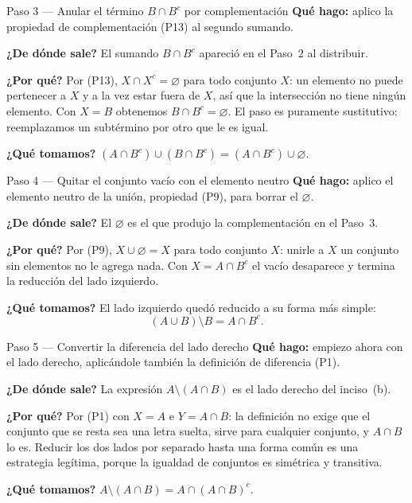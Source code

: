 \documentclass[11pt]{article}
\begin{document}
\begin{paso}{Paso 3 --- Anular el término $B\cap B^{c}$ por complementación}
\textbf{Qué hago:} aplico la propiedad de complementación (P13) al segundo sumando.

\textbf{¿De dónde sale?} El sumando $B\cap B^{c}$ apareció en el Paso~2 al distribuir.

\textbf{¿Por qué?} Por (P13), $X\cap X^{c}=\varnothing$ para todo conjunto $X$: un elemento no
puede pertenecer a $X$ y a la vez estar fuera de $X$, así que la intersección no tiene ningún
elemento. Con $X=B$ obtenemos $B\cap B^{c}=\varnothing$. El paso es puramente sustitutivo:
reemplazamos un subtérmino por otro que le es igual.

\textbf{¿Qué tomamos?} $(A\cap B^{c})\cup(B\cap B^{c})=(A\cap B^{c})\cup\varnothing$.
\end{paso}

\begin{paso}{Paso 4 --- Quitar el conjunto vacío con el elemento neutro}
\textbf{Qué hago:} aplico el elemento neutro de la unión, propiedad (P9), para borrar el
$\varnothing$.

\textbf{¿De dónde sale?} El $\varnothing$ es el que produjo la complementación en el Paso~3.

\textbf{¿Por qué?} Por (P9), $X\cup\varnothing=X$ para todo conjunto $X$: unirle a $X$ un
conjunto sin elementos no le agrega nada. Con $X=A\cap B^{c}$ el vacío desaparece y termina la
reducción del lado izquierdo.

\textbf{¿Qué tomamos?} El lado izquierdo quedó reducido a su forma más simple:
\[
(A\cup B)\setminus B=A\cap B^{c}.
\]
\end{paso}

\begin{paso}{Paso 5 --- Convertir la diferencia del lado derecho}
\textbf{Qué hago:} empiezo ahora con el lado derecho, aplicándole también la definición de
diferencia (P1).

\textbf{¿De dónde sale?} La expresión $A\setminus(A\cap B)$ es el lado derecho del inciso~(b).

\textbf{¿Por qué?} Por (P1) con $X=A$ e $Y=A\cap B$: la definición no exige que el conjunto que
se resta sea una letra suelta, sirve para cualquier conjunto, y $A\cap B$ lo es. Reducir los dos
lados por separado hasta una forma común es una estrategia legítima, porque la igualdad de
conjuntos es simétrica y transitiva.

\textbf{¿Qué tomamos?} $A\setminus(A\cap B)=A\cap(A\cap B)^{c}$.
\end{paso}
\end{document}

